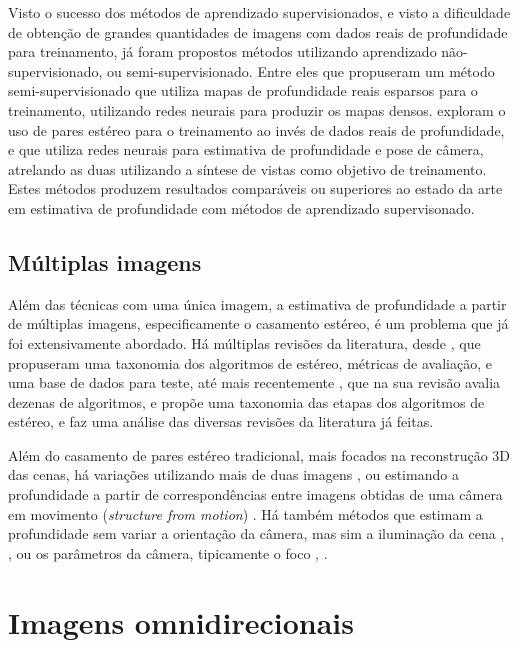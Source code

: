 \documentclass[cic,tc]{iiufrgs}
\begin{document}
Visto o sucesso dos métodos de aprendizado supervisionados, e visto a dificuldade de obtenção de grandes quantidades de imagens com dados reais de profundidade para treinamento, já foram propostos métodos utilizando aprendizado não-supervisionado, ou semi-supervisionado. Entre eles \citet{Kuznietsov2017} que propuseram um método semi-supervisionado que utiliza mapas de profundidade reais esparsos para o treinamento, utilizando redes neurais para produzir os mapas densos. \citet{Godard2016} exploram o uso de pares estéreo para o treinamento ao invés de dados reais de profundidade, e \citet{Zhou2017} que utiliza redes neurais para estimativa de profundidade e pose de câmera, atrelando as duas utilizando a síntese de vistas como objetivo de treinamento. Estes métodos produzem resultados comparáveis ou superiores ao estado da arte em estimativa de profundidade com métodos de aprendizado supervisonado.

\subsection{Múltiplas imagens}

Além das técnicas com uma única imagem, a estimativa de profundidade a partir de múltiplas imagens, especificamente o
casamento estéreo, é um problema que já foi extensivamente abordado. Há múltiplas revisões da literatura, desde \citet{stereoSurvey2001}, que propuseram uma taxonomia dos algoritmos de estéreo, métricas de avaliação, e uma base de dados para teste, até mais recentemente \citet{stereoSurvey2016}, que na sua revisão avalia dezenas de algoritmos, e propõe uma taxonomia das etapas dos algoritmos de estéreo, e faz uma análise das diversas revisões da literatura já feitas.

Além do casamento de pares estéreo tradicional, mais focados na reconstrução 3D das cenas, há variações utilizando mais de duas imagens \citep{multiViewStereo2015}, ou estimando a profundidade a partir de correspondências entre imagens obtidas de uma câmera em movimento (\textit{structure from motion}) \citep{structMotion2016}. Há também métodos que estimam a profundidade sem variar a orientação da câmera, mas sim a iluminação da cena \citep{photometricStereo1989}, \citep{photometricStereo2012}, ou os parâmetros da câmera, tipicamente o foco \citep{defocus1987}, \citep{defocus2015}.


\section{Imagens omnidirecionais}
\end{document}
